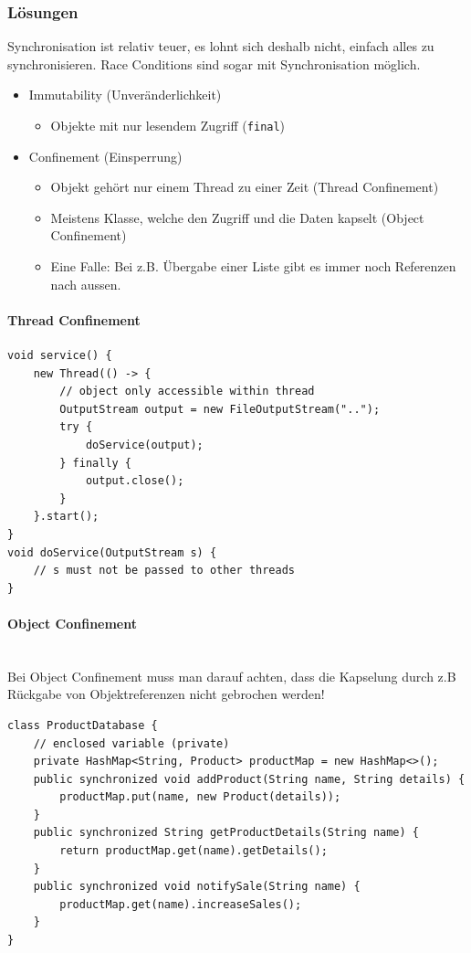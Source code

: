 \subsubsection{Lösungen}
Synchronisation ist relativ teuer, es lohnt sich deshalb nicht, einfach alles zu synchronisieren. Race Conditions sind sogar mit Synchronisation möglich.
\begin{itemize}
	\item Immutability (Unveränderlichkeit)
		\begin{itemize}
			\item Objekte mit nur lesendem Zugriff (\lstinline|final|)
		\end{itemize}
	\item Confinement (Einsperrung)
		\begin{itemize}
			\item Objekt gehört nur einem Thread zu einer Zeit (Thread Confinement)
			\item Meistens Klasse, welche den Zugriff und die Daten kapselt (Object Confinement)
			\item Eine Falle: Bei z.B. Übergabe einer Liste gibt es immer noch Referenzen nach aussen.
		\end{itemize}
\end{itemize}

\paragraph{Thread Confinement} \hfill
\begin{lstlisting}
void service() {
	new Thread(() -> {
		// object only accessible within thread
		OutputStream output = new FileOutputStream("..");
		try {
			doService(output);
		} finally {
			output.close();
		}
	}.start();
}
void doService(OutputStream s) {
	// s must not be passed to other threads
}
\end{lstlisting}

\paragraph{Object Confinement} \hfill \\
Bei Object Confinement muss man darauf achten, dass die Kapselung durch z.B Rückgabe von Objektreferenzen nicht gebrochen werden!
\begin{lstlisting}
class ProductDatabase {
	// enclosed variable (private)
	private HashMap<String, Product> productMap = new HashMap<>();
	public synchronized void addProduct(String name, String details) {
		productMap.put(name, new Product(details));
	}
	public synchronized String getProductDetails(String name) {
		return productMap.get(name).getDetails();
	}
	public synchronized void notifySale(String name) {
		productMap.get(name).increaseSales();
	}
}
\end{lstlisting}


